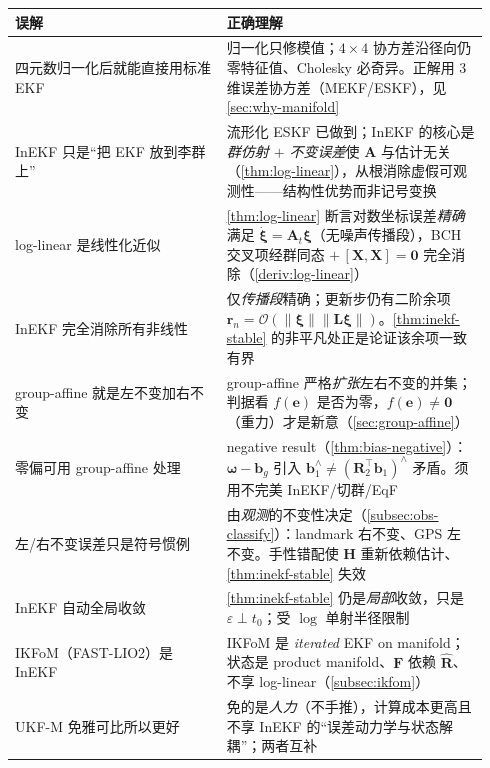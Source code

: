 \begin{table}[H]\centering\small
\begin{tabular}{p{0.42\linewidth}p{0.52\linewidth}}
\toprule
误解 & 正确理解 \\
\midrule
四元数归一化后就能直接用标准 EKF & 归一化只修模值；$4\times4$ 协方差沿径向仍零特征值、Cholesky 必奇异。正解用 $3$ 维误差协方差（MEKF/ESKF），见 \cref{sec:why-manifold} \\
InEKF 只是“把 EKF 放到李群上” & 流形化 ESKF 已做到；InEKF 的核心是\emph{群仿射 $+$ 不变误差}使 $\mathbf{A}$ 与估计无关（\cref{thm:log-linear}），从根消除虚假可观测性——结构性优势而非记号变换 \\
log-linear 是线性化近似 & \cref{thm:log-linear} 断言对数坐标误差\emph{精确}满足 $\dot{\boldsymbol{\xi}}=\mathbf{A}_t\boldsymbol{\xi}$（无噪声传播段），BCH 交叉项经群同态 $+\,[\mathbf{X},\mathbf{X}]=\mathbf{0}$ 完全消除（\cref{deriv:log-linear}） \\
InEKF 完全消除所有非线性 & 仅\emph{传播段}精确；更新步仍有二阶余项 $\mathbf{r}_n=\mathcal{O}(\|\boldsymbol{\xi}\|\|\mathbf{L}\boldsymbol{\xi}\|)$。\cref{thm:inekf-stable} 的非平凡处正是论证该余项一致有界 \\
group-affine 就是左不变加右不变 & group-affine 严格\emph{扩张}左右不变的并集；判据看 $f(\mathbf{e})$ 是否为零，$f(\mathbf{e})\neq\mathbf{0}$（重力）才是新意（\cref{sec:group-affine}） \\
零偏可用 group-affine 处理 & negative result（\cref{thm:bias-negative}）：$\boldsymbol{\omega}-\mathbf{b}_g$ 引入 $\mathbf{b}_1^\wedge\neq(\mathbf{R}_2^\top\mathbf{b}_1)^\wedge$ 矛盾。须用不完美 InEKF/切群/EqF \\
左/右不变误差只是符号惯例 & 由\emph{观测}的不变性决定（\cref{subsec:obs-classify}）：landmark 右不变、GPS 左不变。手性错配使 $\mathbf{H}$ 重新依赖估计、\cref{thm:inekf-stable} 失效 \\
InEKF 自动全局收敛 & \cref{thm:inekf-stable} 仍是\emph{局部}收敛，只是 $\varepsilon\perp t_0$；受 $\log$ 单射半径限制 \\
IKFoM（FAST-LIO2）是 InEKF & IKFoM 是 \emph{iterated} EKF on manifold；状态是 product manifold、$\mathbf{F}$ 依赖 $\hat{\mathbf{R}}$、不享 log-linear（\cref{subsec:ikfom}） \\
UKF-M 免雅可比所以更好 & 免的是\emph{人力}（不手推），计算成本更高且不享 InEKF 的“误差动力学与状态解耦”；两者互补 \\
\bottomrule
\end{tabular}
\end{table}

